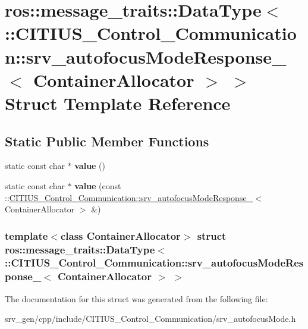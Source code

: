 \hypertarget{structros_1_1message__traits_1_1_data_type_3_01_1_1_c_i_t_i_u_s___control___communication_1_1srv15b05e3f067b162a2a98ed8c48490000}{\section{ros\-:\-:message\-\_\-traits\-:\-:\-Data\-Type$<$ \-:\-:\-C\-I\-T\-I\-U\-S\-\_\-\-Control\-\_\-\-Communication\-:\-:srv\-\_\-autofocus\-Mode\-Response\-\_\-$<$ \-Container\-Allocator $>$ $>$ \-Struct \-Template \-Reference}
\label{structros_1_1message__traits_1_1_data_type_3_01_1_1_c_i_t_i_u_s___control___communication_1_1srv15b05e3f067b162a2a98ed8c48490000}
}
\subsection*{\-Static \-Public \-Member \-Functions}
\begin{DoxyCompactItemize}
\item 
\hypertarget{structros_1_1message__traits_1_1_data_type_3_01_1_1_c_i_t_i_u_s___control___communication_1_1srv15b05e3f067b162a2a98ed8c48490000_a31a41130875a52cd345ceb8e184093f7}{static const char $\ast$ {\bfseries value} ()}\label{structros_1_1message__traits_1_1_data_type_3_01_1_1_c_i_t_i_u_s___control___communication_1_1srv15b05e3f067b162a2a98ed8c48490000_a31a41130875a52cd345ceb8e184093f7}

\item 
\hypertarget{structros_1_1message__traits_1_1_data_type_3_01_1_1_c_i_t_i_u_s___control___communication_1_1srv15b05e3f067b162a2a98ed8c48490000_aa12d895c6ba0b5e31927eebdf6024d3d}{static const char $\ast$ {\bfseries value} (const \-::\hyperlink{struct_c_i_t_i_u_s___control___communication_1_1srv__autofocus_mode_response__}{\-C\-I\-T\-I\-U\-S\-\_\-\-Control\-\_\-\-Communication\-::srv\-\_\-autofocus\-Mode\-Response\-\_\-}$<$ \-Container\-Allocator $>$ \&)}\label{structros_1_1message__traits_1_1_data_type_3_01_1_1_c_i_t_i_u_s___control___communication_1_1srv15b05e3f067b162a2a98ed8c48490000_aa12d895c6ba0b5e31927eebdf6024d3d}

\end{DoxyCompactItemize}
\subsubsection*{template$<$class Container\-Allocator$>$ struct ros\-::message\-\_\-traits\-::\-Data\-Type$<$ \-::\-C\-I\-T\-I\-U\-S\-\_\-\-Control\-\_\-\-Communication\-::srv\-\_\-autofocus\-Mode\-Response\-\_\-$<$ Container\-Allocator $>$ $>$}



\-The documentation for this struct was generated from the following file\-:\begin{DoxyCompactItemize}
\item 
srv\-\_\-gen/cpp/include/\-C\-I\-T\-I\-U\-S\-\_\-\-Control\-\_\-\-Communication/srv\-\_\-autofocus\-Mode.\-h\end{DoxyCompactItemize}

